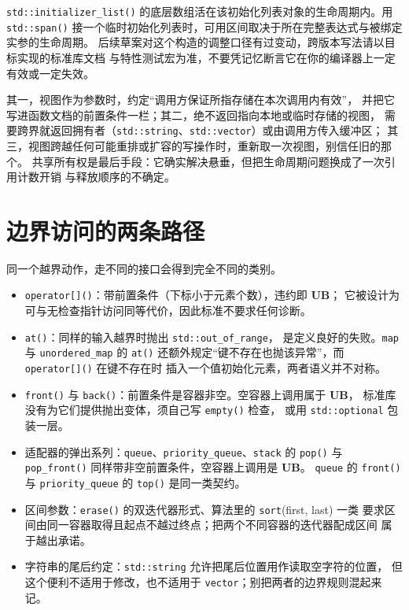 \documentclass[12pt,a4paper,fontset=fandol]{ctexbook}
\newcommand{\Fn}[1]{\texttt{#1()}}
\newcommand{\Tp}[1]{\texttt{#1}}
\newcommand{\Bk}{\discretionary{}{}{}}
\newcommand{\UB}{\textbf{\textsf{UB}}}
\begin{document}
\begin{note}[title={span 接初始化列表的生命周期口径}]
\Fn{std::initializer{\Bk}\_list} 的底层数组活在该初始化列表对象的生命周期内。用
\Fn{std::span} 接一个临时初始化列表时，可用区间取决于所在完整表达式与被绑定实参的生命周期。
后续草案对这个构造的调整口径有过变动，跨版本写法请以目标实现的标准库文档
与特性测试宏为准，不要凭记忆断言它在你的编译器上一定有效或一定失效。
\end{note}

\begin{bestpractice}[title={视图入参的三条纪律}]
其一，视图作为参数时，约定“调用方保证所指存储在本次调用内有效”，
并把它写进函数文档的前置条件一栏；其二，绝不返回指向本地或临时存储的视图，
需要跨界就返回拥有者（\Tp{std::string}、\Tp{std::vector}）或由调用方传入缓冲区；
其三，视图跨越任何可能重排或扩容的写操作时，重新取一次视图，别信任旧的那个。
共享所有权是最后手段：它确实解决悬垂，但把生命周期问题换成了一次引用计数开销
与释放顺序的不确定。
\end{bestpractice}

\section{边界访问的两条路径}\label{sec:ub12-bounds}

同一个越界动作，走不同的接口会得到完全不同的类别。

\begin{itemize}
  \item \Fn{operator[]}：带前置条件（下标小于元素个数），违约即 \UB{}；
        它被设计为可与无检查指针访问同等代价，因此标准不要求任何诊断。
  \item \Tp{at()}：同样的输入越界时抛出 \Tp{std::out{\Bk}\_of{\Bk}\_range}，
        是定义良好的失败。\Tp{map} 与 \Tp{unordered{\Bk}\_map} 的 \Fn{at}
        还额外规定“键不存在也抛该异常”，而 \Fn{operator[]} 在键不存在时
        插入一个值初始化元素，两者语义并不对称。
  \item \Fn{front} 与 \Fn{back}：前置条件是容器非空。空容器上调用属于 \UB{}，
        标准库没有为它们提供抛出变体，须自己写 \Fn{empty} 检查，
        或用 \Tp{std::optional} 包装一层。
  \item 适配器的弹出系列：\Tp{queue}、\Tp{priority{\Bk}\_queue}、\Tp{stack} 的
        \Fn{pop} 与 \Fn{pop{\Bk}\_front} 同样带非空前置条件，空容器上调用是 \UB{}。
        \Tp{queue} 的 \Fn{front} 与 \Tp{priority{\Bk}\_queue} 的 \Fn{top} 是同一类契约。
  \item 区间参数：\Fn{erase} 的双迭代器形式、算法里的 \Tp{sort}(first, last) 一类
        要求区间由同一容器取得且起点不越过终点；把两个不同容器的迭代器配成区间
        属于越出承诺。
  \item 字符串的尾后约定：\Tp{std::string} 允许把尾后位置用作读取空字符的位置，
        但这个便利不适用于修改，也不适用于 \Tp{vector}；别把两者的边界规则混起来记。
\end{itemize}
\end{document}
